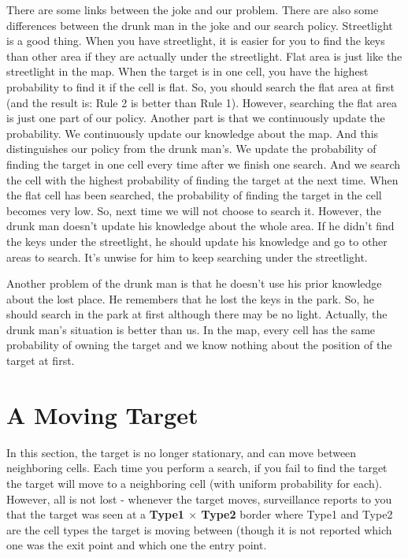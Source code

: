 \documentclass[letter]{article}
\begin{document}
\begin{enumerate}
	\par{There are some links between the joke and our problem. There are also some differences between the drunk man in the joke and our search policy. Streetlight is a good thing. When you have streetlight, it is easier for you to find the keys than other area if they are actually under the streetlight. Flat area is just like the streetlight in the map. When the target is in one cell, you have the highest probability to find it if the cell is flat. So, you should search the flat area at first (and the result is: Rule 2 is better than Rule 1). However, searching the flat area is just one part of our policy. Another part is that we continuously update the probability. We continuously update our knowledge about the map. And this distinguishes our policy from the drunk man’s. We update the probability of finding the target in one cell every time after we finish one search. And we search the cell with the highest probability of finding the target at the next time. When the flat cell has been searched, the probability of finding the target in the cell becomes very low. So, next time we will not choose to search it. However, the drunk man doesn’t update his knowledge about the whole area. If he didn’t find the keys under the streetlight, he should update his knowledge and go to other areas to search. It’s unwise for him to keep searching under the streetlight.} 
	\par{Another problem of the drunk man is that he doesn’t use his prior knowledge about the lost place. He remembers that he lost the keys in the park. So, he should search in the park at first although there may be no light. Actually, the drunk man’s situation is better than us. In the map, every cell has the same probability of owning the target and we know nothing about the position of the target at first.}
	
\end{enumerate}

\section{A Moving Target}
\label{sec:A Moving Target}
\par{In this section, the target is no longer stationary, and can move between neighboring cells. Each time you perform
	a search, if you fail to find the target the target will move to a neighboring cell (with uniform probability for each).
	However, all is not lost - whenever the target moves, surveillance reports to you that the target was seen at a \textbf{Type1
	$ \times $ Type2} border where Type1 and Type2 are the cell types the target is moving between (though it is not reported
	which one was the exit point and which one the entry point. }
	
\end{document}
